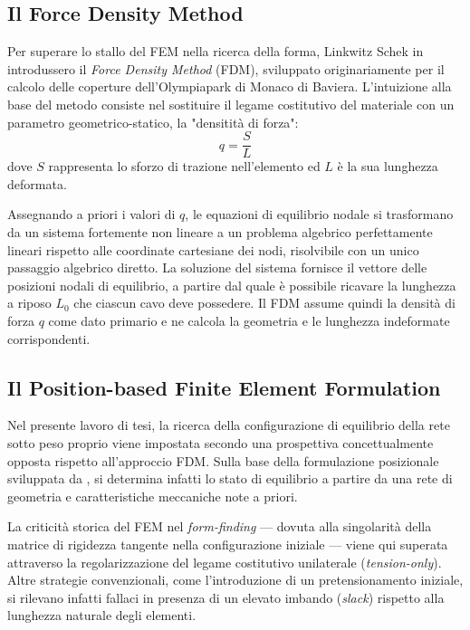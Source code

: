 \subsection{Il Force Density Method}
Per superare lo stallo del FEM nella ricerca della forma, Linkwitz Schek in \cite{linkwitz1971} introdussero il \textit{Force Density Method} (FDM), sviluppato originariamente per il calcolo delle coperture dell'Olympiapark di Monaco di Baviera. L'intuizione alla base del metodo consiste nel sostituire il legame costitutivo del materiale con un parametro geometrico-statico, la "densitità di forza": 
\begin{equation}
    q = \frac{S}{L}
    \label{eq:densità_di_forza}
\end{equation}
dove $S$ rappresenta lo sforzo di trazione nell'elemento ed $L$ è la sua lunghezza deformata. 

Assegnando a priori i valori di $q$, le equazioni di equilibrio nodale si trasformano da un sistema fortemente non lineare a un problema algebrico perfettamente lineari rispetto alle coordinate cartesiane dei nodi, risolvibile con un unico passaggio algebrico diretto. La soluzione del sistema fornisce il vettore delle posizioni nodali di equilibrio, a partire dal quale è possibile ricavare la lunghezza a riposo $L_0$ che ciascun cavo deve possedere. Il FDM assume quindi la densità di forza $q$ come dato primario e ne calcola la geometria e le lunghezza indeformate corrispondenti. 

\subsection{Il Position-based Finite Element Formulation}
Nel presente lavoro di tesi, la ricerca della configurazione di equilibrio della rete sotto peso proprio viene impostata secondo una prospettiva concettualmente opposta rispetto all'approccio FDM. Sulla base della formulazione posizionale sviluppata da \textcite{Valvo1,Valvo2}, si determina infatti lo stato di equilibrio a partire da una rete di geometria e caratteristiche meccaniche note a priori.

La criticità storica del FEM nel \textit{form-finding} --- dovuta alla singolarità della matrice di rigidezza tangente nella configurazione iniziale --- viene qui superata attraverso la regolarizzazione del legame costitutivo unilaterale (\textit{tension-only}). Altre strategie convenzionali, come l'introduzione di un pretensionamento iniziale, si rilevano infatti fallaci in presenza di un elevato imbando (\textit{slack}) rispetto alla lunghezza naturale degli elementi.

